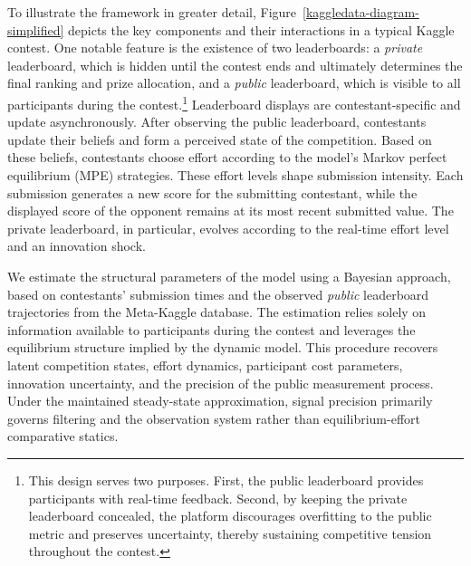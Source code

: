 \documentclass[mnsc]{informs3}
\begin{document}
To illustrate the framework in greater detail, Figure~\ref{kaggledata-diagram-simplified} depicts the key components and their interactions in a typical Kaggle contest.
One notable feature is the existence of two leaderboards: a \textit{private} leaderboard, which is hidden until the contest ends and ultimately determines the final ranking and prize allocation, and a \textit{public} leaderboard, which is visible to all participants during the contest.\footnote{
This design serves two purposes.
First, the public leaderboard provides participants with real-time feedback.
Second, by keeping the private leaderboard concealed, the platform discourages overfitting to the public metric and preserves uncertainty, thereby sustaining competitive tension throughout the contest.
}
Leaderboard displays are contestant-specific and update asynchronously.
After observing the public leaderboard, contestants update their beliefs and form a perceived state of the competition.
Based on these beliefs, contestants choose effort according to the model’s Markov perfect equilibrium (MPE) strategies.
These effort levels shape submission intensity. 
Each submission generates a new score for the submitting contestant, while the displayed score of the opponent remains at its most recent submitted value.
The private leaderboard, in particular, evolves according to the real-time effort level and an innovation shock.


We estimate the structural parameters of the model using a Bayesian approach, based on contestants’ submission times and the observed \textit{public} leaderboard trajectories from the Meta-Kaggle database.
The estimation relies solely on information available to participants during the contest and leverages the equilibrium structure implied by the dynamic model.
This procedure recovers latent competition states, effort dynamics, participant cost parameters, innovation uncertainty, and the precision of the public measurement process. Under the maintained steady-state approximation, signal precision primarily governs filtering and the observation system rather than equilibrium-effort comparative statics.
\end{document}
